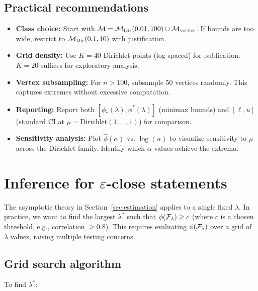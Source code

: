 \documentclass{article}
\begin{document}
\subsection{Practical recommendations}

\begin{itemize}
    \item \textbf{Class choice:} Start with $\mathcal{M} = \mathcal{M}_{\text{Dir}}(0.01, 100) \cup \mathcal{M}_{\text{vertex}}$. If bounds are too wide, restrict to $\mathcal{M}_{\text{Dir}}(0.1, 10)$ with justification.

    \item \textbf{Grid density:} Use $K = 40$ Dirichlet points (log-spaced) for publication. $K = 20$ suffices for exploratory analysis.

    \item \textbf{Vertex subsampling:} For $n > 100$, subsample 50 vertices randomly. This captures extremes without excessive computation.

    \item \textbf{Reporting:} Report both $[\phi_*(\lambda), \phi^*(\lambda)]$ (minimax bounds) and $[\ell, u]$ (standard CI at $\mu = \text{Dirichlet}(1, \ldots, 1)$) for comparison.

    \item \textbf{Sensitivity analysis:} Plot $\hat{\phi}(\alpha)$ vs. $\log(\alpha)$ to visualize sensitivity to $\mu$ across the Dirichlet family. Identify which $\alpha$ values achieve the extrema.
\end{itemize}

\section{Inference for $\varepsilon$-close statements}\label{sec:grid}

The asymptotic theory in Section~\ref{sec:estimation} applies to a single fixed
$\lambda$. In practice, we want to find the largest $\lambda^*$ such that
$\phi(\mathcal{F}_\lambda) \geq c$ (where $c$ is a chosen threshold, e.g., correlation
$\geq 0.8$). This requires evaluating $\phi(\mathcal{F}_\lambda)$ over a grid of $\lambda$
values, raising multiple testing concerns.

\subsection{Grid search algorithm}

To find $\lambda^*$:
\end{document}
